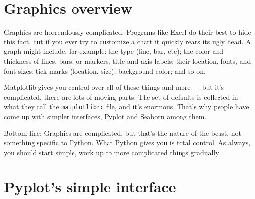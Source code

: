 \documentclass[11pt]{article}
\begin{document}
\section{Graphics overview}

Graphics are horrendously complicated.  Programs like Excel
do their best to hide this fact, but if you ever try to customize
a chart it quickly rears its ugly head.
A graph might include, for example:  the type (line, bar, etc);
the color and thickness of lines, bars, or markers;
title and axis labels;
their location, fonts, and font sizes;
tick marks (location, size);
background color;
and so on.

Matplotlib gives you control over all of these things and more ---
but it's complicated, there are lots of moving parts.
The set of defaults is collected in what they call the
{\tt matplotlibrc} file, and
\href{http://matplotlib.org/1.4.0/users/customizing.html}{it's enormous}.
That's why people have come up with simpler interfaces,
Pyplot and Seaborn among them.

Bottom line:  Graphics are complicated, but that's the nature of the beast,
not something specific to Python.
What Python gives you is total control.
As always, you should start simple, work up to more complicated things gradually.


\section{Pyplot's simple interface}

\end{document}
